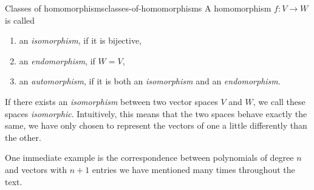 \begin{definition}{Classes of homomorphisms}{classes-of-homomorphisms}
 A homomorphism $f:V \to W$ is called
 \begin{enumerate}
  \item an \emph{isomorphism}, if it is bijective,
  \item an \emph{endomorphism}, if $W = V$,
  \item an \emph{automorphism}, if it is both an \emph{isomorphism} and an
   \emph{endomorphism}.
 \end{enumerate}
\end{definition}

If there exists an \emph{isomorphism} between two vector spaces $V$ and $W$, we
call these spaces \emph{isomorphic}. Intuitively, this means that the two spaces
behave exactly the same, we have only chosen to represent the vectors of one a
little differently than the other.

One immediate example is the correspondence between polynomials of degree $n$
and vectors with $n + 1$ entries we have mentioned many times throughout the
text.
